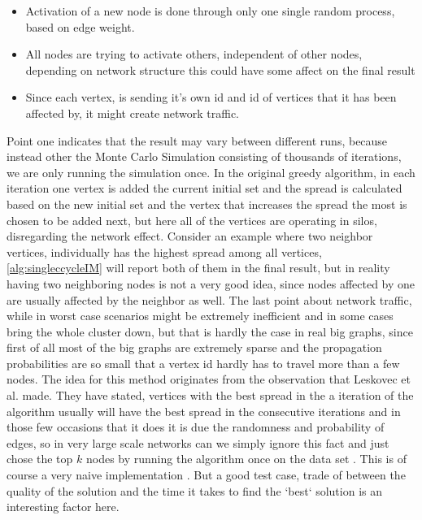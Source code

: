 \documentclass[english]{tktltiki}
\begin{document}
\begin{itemize}
\item Activation of a new node is done through only one single random process, based on edge weight.
\item All nodes are trying to activate others, independent of other nodes, depending on network structure this could have some affect on the final result
\item Since each vertex, is sending it's own id and id of vertices that it has been affected by, it might create network traffic.
\end{itemize}

Point one indicates that the result may vary between different runs, because instead other the Monte Carlo Simulation consisting of thousands of iterations, we are only running the simulation once. In the original greedy algorithm, in each iteration one vertex is added the current initial set and the spread is calculated based on the new initial set and the vertex that increases the spread the most is chosen to be added next, but here all of the vertices are operating in silos, disregarding the network effect. Consider an example where two neighbor vertices, individually has the highest spread among all vertices, \ref{alg:singleccycleIM} will report both of them in the final result, but in reality having two neighboring nodes is not a very good idea, since nodes affected by one are usually affected by the neighbor as well. The last point about network traffic, while in worst case scenarios might be extremely inefficient and in some cases bring the whole cluster down, but that is hardly the case in real big graphs, since first of all most of the big graphs are extremely sparse and the propagation probabilities are so small that a vertex id hardly has to travel more than a few nodes. The idea for this method originates from the observation that Leskovec et al. \cite{leskovec07} made. They have stated, vertices with the best spread in the a iteration of the algorithm usually will have the best spread in the consecutive iterations and in those few occasions that it does it is due the randomness and probability of edges, so in very large scale networks can we simply ignore this fact and just chose the top $k$ nodes by running the algorithm once on the data set . This is of course a very naive implementation . But a good test case, trade of between the quality of the solution and the time it takes to find the `best` solution is an interesting factor here. 
\end{document}
